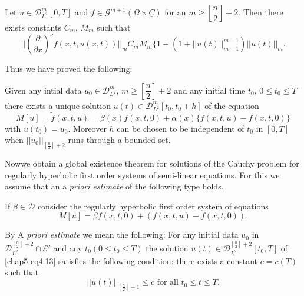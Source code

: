 \setcounter{lemma}{0}
\begin{lemma}\label{chap5-sec4-lem1} %
Let $u \in \mathscr{D}^m_{L^2 } [0, T]$ and $f \in
\mathscr{G}^{m+1} (\Omega \times \underline{C})$ for an $m \geq
        \left[\dfrac{n}{2}\right]+2$. Then there exists constants
        $C_m$, $M_m$ such that   
$$
||\left(\frac{\partial}{\partial x}\right)^\nu f (x, t, u(x, t))||_m
C_m M_m\Big\{1 + (1 + || u (t)||^{m-1}_{m-1})  || u (t) ||_m.  
$$
\end{lemma}

Thus we have proved the following: 

\setcounter{theorem}{0}
\begin{theorem}\label{chap5-sec4-thm1}
Given any intial data $u_0 \in \mathscr{D}^m_{L^2}$, $m \geq
 \left[\dfrac{n}{2}\right] + 2$ and any initial time $t_0$, $0 \leq
 t_0 \leq T$ there exists a unique solution $u(t) \in
 \mathscr{D}^m_{L^2} [t_0, t_0 + h]$ of the equation  
\begin{equation*}
M[u] = \tilde{f}(x,t,u) = \beta (x) f(x, t, 0) + \alpha (x) \{ f(x,
t, u) - f (x, t, 0) \} \tag*{$(4.1)'$} 
\end{equation*}
with $u(t_0)= u_0$. Moreover $h$ can be chosen to be independent of
$t_0$ in $[0, T]$ when $||u_0||_{\left[\frac{n}{2}\right]+2}$ runs
through a bounded set.   
\end{theorem}

Now\pageoriginale we obtain a global existence theorem for solutions
of the Cau\-chy problem for regularly hyperbolic first order systems of
semi-linear equa\-tions. For this we assume that an a \textit{priori
  estimate} of the following type holds.  

If $\beta \in \mathscr{D}$ consider the regularly hyperbolic
first order system of equations 
\begin{equation*}
M[u] = \beta f (x, t, 0) + (f(x, t, u) - f(x, t,
0)). \tag{4.13}\label{chap5-eq4.13}  
\end{equation*}

By A \textit{priori estimate} we mean the following: For any initial
data $u_0$ in $\mathscr{D}^{\left[\frac{n}{2}\right] +2}_{L^2} \cap
\mathscr{E}'$ 
and any $t_0 (0 \leq t_0 \leq T)$ the solution $u (t) \in
\mathscr{D}^{\left[\frac{n}{2}\right] +2}_{L^2} [t_0, T] $ of
\eqref{chap5-eq4.13} 
satisfies the following condition: there exists a constant $c = c(T)$
such that   
\begin{equation*} 
|| u(t) ||_{\left[\frac{n}{2}\right]+1} \leq  c \text{ for all } t_0
\leq t \leq T. \tag{4.14}\label{chap5-eq4.14} 
\end{equation*}

